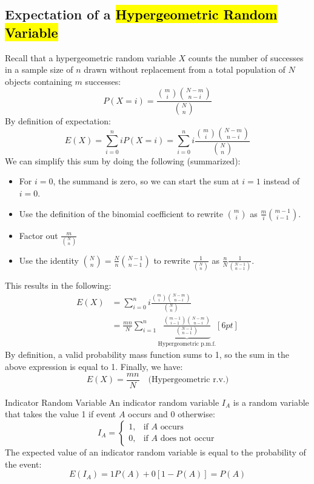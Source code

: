 ﻿\documentclass[12pt]{article}
\begin{document}
\subsection*{Expectation of a \hl{Hypergeometric Random Variable}}
Recall that a hypergeometric random variable $X$ counts the number of successes in a sample size of $n$ drawn without replacement from a total population of $N$ objects containing $m$ successes:
\[
P(X=i)=\frac{\binom{m}{i}\binom{N-m}{n-i}}{\binom{N}{n}}
\]
By definition of expectation:
\[
E(X)=\sum_{i=0}^{n}iP(X=i) =\sum_{i=0}^{n}i\frac{\binom{m}{i}\binom{N-m}{n-i}}{\binom{N}{n}}
\]
We can simplify this sum by doing the following (summarized):
\begin{itemize}
    \item For $i=0$, the summand is zero, so we can start the sum at $i=1$ instead of $i=0$.
    \item Use the definition of the binomial coefficient to rewrite $\binom{m}{i}$ as $\frac{m}{i}\binom{m-1}{i-1}$.
    \item Factor out $\frac{m}{\binom{N}{n}}$
    \item Use the identity $\binom{N}{n}=\frac{N}{n}\binom{N-1}{n-1}$ to rewrite $\frac{1}{\binom{N}{n}}$ as $\frac{n}{N}\frac{1}{\binom{N-1}{n-1}}$.
\end{itemize}
This results in the following:
\[
\begin{aligned}
E(X)
&=\sum_{i=0}^{n}i\frac{\binom{m}{i}\binom{N-m}{n-i}}{\binom{N}{n}}\\[6pt]
&=\frac{mn}{N}\sum_{i=1}^{n}
\underbrace{\frac{\binom{m-1}{i-1}\binom{N-m}{n-i}}{\binom{N-1}{n-1}}}_{\text{Hypergeometric p.m.f.}}[6pt]
\end{aligned}
\]
By definition, a valid probability mass function sums to 1, so the sum in the above expression is equal to 1. Finally, we have:
\[\boxed{E(X) = \frac{mn}{N} \quad \text{(Hypergeometric r.v.)}}\]
\begin{definition}{Indicator Random Variable}
    An indicator random variable $I_A$ is a random variable that takes the value 1 if event $A$ occurs and 0 otherwise:
    \[I_A = \begin{cases}
    1, & \text{if } A \text{ occurs}\\
    0, & \text{if } A \text{ does not occur}
    \end{cases}\]
    The expected value of an indicator random variable is equal to the probability of the event:
    \[E(I_A) = 1P(A) + 0 [1-P(A)] = P(A)\]
\end{definition}
\end{document}
